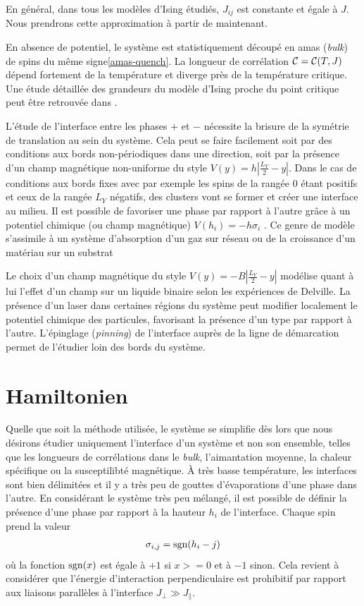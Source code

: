 En général, dans tous les modèles d'Ising étudiés, $J_{ij}$ est constante et égale à $J$. Nous prendrons cette approximation à partir de maintenant.

En absence de potentiel, le système est statistiquement découpé en amas (\textit{bulk}) de spins du même signe\ref{amas-quench}. La longueur de corrélation   $\mathcal{C}= \mathcal{C}(T,J)$ dépend fortement de la température et diverge près de la température critique. Une étude détaillée des grandeurs du modèle d'Ising proche du point critique\cite{onsager,3d} peut être retrouvée dans \cite{these_david}.

L'étude de l'interface entre les phases $+$ et $-$ nécessite la brisure de la symétrie de translation au sein du système. Cela peut se faire facilement soit par des conditions aux bords non-périodiques dans une direction, soit  par la présence d'un champ magnétique non-uniforme du style $V(y) = h |\frac{L_Y}{2}-y|$. 
Dans le cas de conditions aux bords fixes avec par exemple les spins de la rangée $0$ étant positifs et ceux de la rangée $L_Y$ négatifs, des clusters vont se former et créer une interface au milieu. Il est possible de favoriser une phase par rapport à l'autre grâce à un potentiel chimique (ou champ magnétique) $V(h_i) = -h \sigma_i$ \cite{}. Ce genre de modèle s'assimile à un système d'absorption d'un gaz sur réseau\cite{} ou de la croissance d'un matériau sur un substrat\cite{}

Le choix d'un champ magnétique du style $V(y) = - B |\frac{L_Y}{2}-y|$ modélise quant à lui l'effet d'un champ  sur un liquide binaire selon les expériences de Delville\cite{}. La présence d'un laser dans certaines régions du système peut modifier localement le potentiel chimique des particules, favorisant la présence d'un type par rapport à l'autre. L'épinglage\cite{} (\textit{pinning}) de l'interface auprès de la ligne de démarcation permet de l'étudier loin des bords du système.		
		
		\section{Hamiltonien}
	
Quelle que soit la méthode utilisée, le système se simplifie dès lors que nous désirons étudier uniquement l'interface d'un système et non son ensemble, telles que les longueurs de corrélations dans le \textit{bulk}, l'aimantation moyenne, la chaleur spécifique ou la susceptilibté magnétique. À très basse température, les interfaces sont bien délimitées et il y a très peu de gouttes d'évaporations d'une phase dans l'autre. En considérant le système très peu mélangé, il est possible de définir la présence d'une phase par rapport à la hauteur $h_i$ de l'interface. Chaque spin prend la valeur
\begin{align*}
	\sigma_{i,j} = \operatorname{sgn}(h_i-j)
\end{align*}
où la fonction $\operatorname{sgn}(x)$ est égale à $+1$ si $x>=0$ et à $-1$ sinon. Cela revient à considérer que l'énergie d'interaction perpendiculaire est prohibitif par rapport aux liaisons parallèles à l'interface $J_\perp \gg J_\parallel$. 

